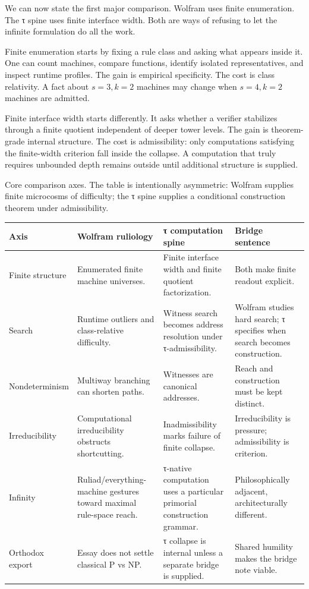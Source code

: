 \documentclass{pantarhei-researchnote}
\begin{document}
We can now state the first major comparison. Wolfram uses finite
enumeration. The τ spine uses finite interface width. Both are ways of
refusing to let the infinite formulation do all the work.

Finite enumeration starts by fixing a rule class and asking what appears
inside it. One can count machines, compare functions, identify isolated
representatives, and inspect runtime profiles. The gain is empirical
specificity. The cost is class relativity. A fact about \(s=3,k=2\)
machines may change when \(s=4,k=2\) machines are admitted.

Finite interface width starts differently. It asks whether a verifier
stabilizes through a finite quotient independent of deeper tower levels.
The gain is theorem-grade internal structure. The cost is admissibility:
only computations satisfying the finite-width criterion fall inside the
collapse. A computation that truly requires unbounded depth remains outside
until additional structure is supplied.

\begin{widetable}[t]
\caption{Core comparison axes. The table is intentionally asymmetric:
Wolfram supplies finite microcosms of difficulty; the τ spine supplies a
conditional construction theorem under admissibility.}
\label{tab:comparison}
\prtablefont
\begin{tabularx}{\textwidth}{p{}Y Y Y}
\toprule
\textbf{Axis} & \textbf{Wolfram ruliology} & \textbf{τ computation spine} & \textbf{Bridge sentence} \\
\midrule
Finite structure & Enumerated finite machine universes. & Finite interface width and finite quotient factorization. & Both make finite readout explicit. \\
Search & Runtime outliers and class-relative difficulty. & Witness search becomes address resolution under τ-admissibility. & Wolfram studies hard search; τ specifies when search becomes construction. \\
Nondeterminism & Multiway branching can shorten paths. & Witnesses are canonical addresses. & Reach and construction must be kept distinct. \\
Irreducibility & Computational irreducibility obstructs shortcutting. & Inadmissibility marks failure of finite collapse. & Irreducibility is pressure; admissibility is criterion. \\
Infinity & Ruliad/everything-machine gestures toward maximal rule-space reach. & τ-native computation uses a particular primorial construction grammar. & Philosophically adjacent, architecturally different. \\
Orthodox export & Essay does not settle classical P vs NP. & τ collapse is internal unless a separate bridge is supplied. & Shared humility makes the bridge note viable. \\
\bottomrule
\end{tabularx}
\end{widetable}
\end{document}
